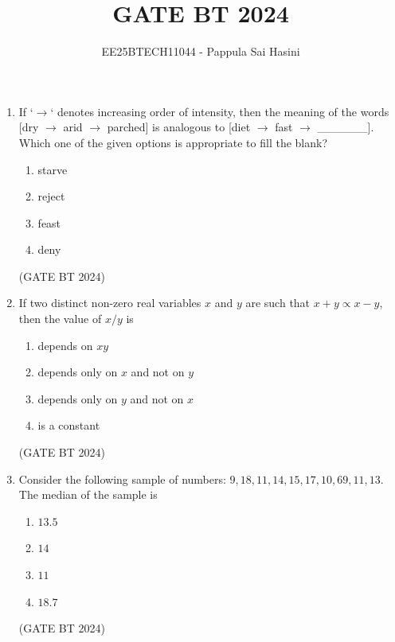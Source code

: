 \documentclass[journal,12pt,onecolumn]{IEEEtran}
\theoremstyle{remark}
\begin{document}
\title{GATE BT 2024}
\author{EE25BTECH11044 - Pappula Sai Hasini}
\maketitle
\renewcommand{\thefigure}{\theenumi}
\renewcommand{\thetable}{\theenumi}
\begin{enumerate}
\item
If `$\rightarrow$` denotes increasing order of intensity, then the meaning of the words [dry $\rightarrow$ arid $\rightarrow$ parched] is analogous to [diet $\rightarrow$ fast $\rightarrow$ \_\_\_\_\_\_]. Which one of the given options is appropriate to fill the blank?
\begin{multicols}{2}
\begin{enumerate}
   \item starve 
   \item reject 
   \item feast 
   \item deny 
\end{enumerate}
\end{multicols}
\hfill(GATE BT 2024)


\item 
If two distinct non-zero real variables $x$ and $y$ are such that $x+y \propto x-y$, then the value of $x/y$ is
\begin{multicols}{2}
\begin{enumerate}
    \item depends on $xy$
    \item depends only on $x$ and not on $y$
    \item depends only on $y$ and not on $x$
    \item is a constant
\end{enumerate}
\end{multicols}
\hfill(GATE BT 2024)

\item 
Consider the following sample of numbers: $9, 18, 11, 14, 15, 17, 10, 69, 11, 13$. The median of the sample is
\begin{multicols}{2}
\begin{enumerate}
    \item $13.5$
    \item $14$
    \item $11$
    \item $18.7$
\end{enumerate}
\end{multicols}
\hfill(GATE BT 2024)


\end{enumerate}
\end{document}
